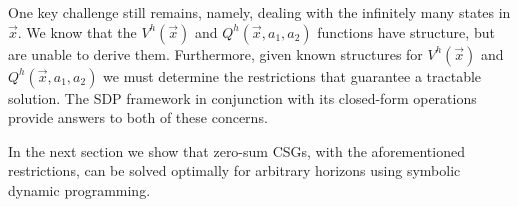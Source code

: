 One key challenge still remains, namely, dealing with the infinitely
many states in $\vec{x}$. We know that the {\small $V^{h}(\vec{x})$} and 
{\small $Q^{h}(\vec{x}, a_1, a_2)$} functions have structure, but are unable to derive
them. Furthermore, given known structures for {\small $V^{h}(\vec{x})$} and 
{\small $Q^{h}(\vec{x}, a_1, a_2)$} we must determine the restrictions that
guarantee a tractable solution. The SDP framework in conjunction with its
closed-form operations provide answers to both of these concerns.



In the next section we show that zero-sum CSGs, with the 
aforementioned restrictions, can be solved optimally for arbitrary 
horizons using symbolic dynamic programming.